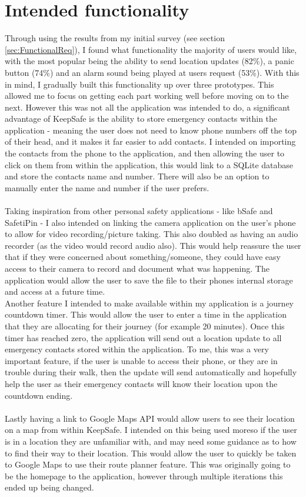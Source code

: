 \documentclass[a4paper]{report}
\begin{document}
\section{Intended functionality}
\label{sec:IntendedFunc}
Through using the results from my initial survey (see section \ref{sec:FunctionalReq}), I found what functionality the majority of users would like, with the most popular being the ability to send location updates (82\%), a panic button (74\%) and an alarm sound being played at users request (53\%). With this in mind, I gradually built this functionality up over three prototypes. This allowed me to focus on getting each part working well before moving on to the next. However this was not all the application was intended to do, a significant advantage of KeepSafe is the ability to store emergency contacts within the application - meaning the user does not need to know phone 
numbers off the top of their head, and it makes it far easier to add contacts. I intended on importing the contacts from the phone to the application, and then allowing the user to click on them from within the application, this would link to a SQLite database and store the contacts name and number. There will also be an option to manually enter the name and number if the user prefers. \\
\\Taking inspiration from other personal safety applications - like bSafe\cite{bSafe} and SafetiPin\cite{safetipin} - I also intended on linking the camera application on the user's phone to allow for video recording/picture taking. This also doubled as having an audio recorder (as the video would record audio also). This would help reassure the user that if they were concerned about something/someone, they could have easy access to their camera to record and document what was happening. The application would allow the user to save the file to their phones internal storage and access at a future time. \\ Another feature I intended to make available within my application is a journey countdown timer. This would allow the user to enter a time in the application that they are allocating for their journey (for example 20 minutes). Once this timer has reached zero, the application will send out a location update to all emergency contacts stored within the application. To me, this was a very important feature, if the user is unable to access their phone, or they are in trouble during their walk, then the update will send automatically and hopefully help the user as their emergency contacts will know their location upon the countdown ending. \\\\Lastly having a link to Google Maps API would allow users to see their location on a map from within KeepSafe. I intended on this being used moreso if the user is in a location they are unfamiliar with, and may need some guidance as to how to find their way to their location. This would allow the user to quickly be taken to Google Maps to use their route planner feature. This was originally going to be the homepage to the application, however through multiple iterations this ended up being changed.  
\end{document}
